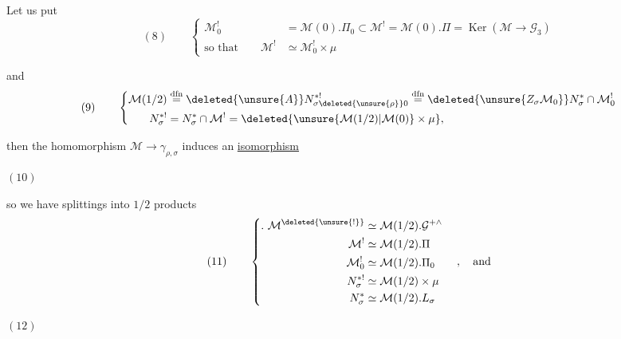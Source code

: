 
Let us put
\[
(8)\qquad
\left\{\begin{aligned}
\mathcal M_0^!&=\mathcal M(0).\Pi_0
\subset\mathcal M^!=\mathcal M(0).\Pi
=\operatorname{Ker}(\mathcal M\to\mathcal G_3)\\
\text{so that}\qquad
\mathcal M^!&\simeq\mathcal M_0^!\times\mu
\end{aligned}\right.
\]

and
\[
(9)\qquad
\left\{\begin{aligned}
\mathcal M(1/2)
&\overset{\mathrm{dfn}}=
\deleted{\unsure{A}}N_{\sigma\deleted{\unsure{\rho}}0}^{*!}
\overset{\mathrm{dfn}}=
\deleted{\unsure{Z_\sigma\mathcal M_0}}N_\sigma^*\cap\mathcal M_0^!\\
N_\sigma^{*!}&=N_\sigma^*\cap\mathcal M^!
=\deleted{\unsure{\mathcal M(1/2)|\mathcal M(0)}\times\mu},
\end{aligned}\right.
\]

then the homomorphism  $\mathcal M\to\gamma_{\rho,\sigma}$
induces an \uline{isomorphism}

\( (10) \)\quad
{}

so we have splittings into $1/2$  products
\[
(11)\qquad
\left\{\begin{aligned}
.\ \mathcal M^{\deleted{\unsure{!}}}
  &\simeq\mathcal M(1/2).\mathcal G^{+\wedge}\\
\mathcal M^!&\simeq\mathcal M(1/2).\Pi\\
\mathcal M_0^!&\simeq\mathcal M(1/2).\Pi_0\\
N_\sigma^{*!}&\simeq\mathcal M(1/2)\times\mu\\
N_\sigma^*&\simeq\mathcal M(1/2).L_\sigma
\end{aligned}\right.\quad,\quad\text{and}
\]

\( (12) \)\quad
{}



